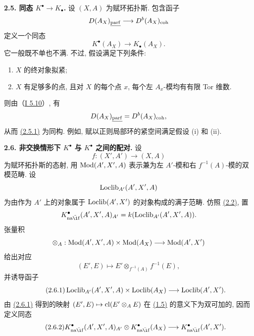 \textbf{2.5. 同态 \(K^{\bullet}\to K_{\bullet}\).} 设 \((X,A)\) 为赋环拓扑斯. 包含函子
\[
 D(A_X)_{\underline{\operatorname{parf}}}\longrightarrow D^b(A_X)_{\operatorname{coh}}
\]
定义一个同态
\begin{equation}\tag{2.5.1}
 K^{\bullet}(A_X)\longrightarrow K_{\bullet}(A_X).
\end{equation}
它一般既不单也不满. 不过, 假设满足下列条件:
\begin{enumerate}[label=(\roman*)]
\item \(X\) 的终对象拟紧;
\item \(X\) 有足够多的点, 且对 \(X\) 的每个点 \(x\), 每个左 \(A_x\)-模均有有限 Tor 维数.
\end{enumerate}
则由（\hyperlink{sga6.e01.cor.5-10}{I 5.10}）, 有
\[
 D(A_X)_{\underline{\operatorname{parf}}}=D^b(A_X)_{\operatorname{coh}},
\]
从而 \hyperlink{sga6.e04.eq.2-5-1}{(2.5.1)} 为同构. 例如, 赋以正则局部环的紧空间满足假设 (i) 和 (ii).

\textbf{2.6. 非交换情形下 \(K^{\bullet}\) 与 \(K^{\bullet}\) 之间的配对.} 设
\[
 f:(X',A')\longrightarrow (X,A)
\]
为赋环拓扑斯的态射, 用 \(\operatorname{Mod}(A',X',A)\) 表示兼为左 \(A'\)-模和右 \(f^{-1}(A)\)-模的双模范畴. 设
\[
 \operatorname{Loclib}_{A'}(A',X',A)
\]
为由作为 \(A'\) 上的对象属于 \(\operatorname{Loclib}(A',X')\) 的对象构成的满子范畴. 仿照 \hyperlink{sga6.e04.def.2-2}{(2.2)}, 置
\[
 K^{\bullet}_{\naif}(A',X',A)_{A'}=k(\Loclib_{A'}(A',X',A)).
\]
张量积
\[
 \otimes_A:\operatorname{Mod}(A',X',A)\times\operatorname{Mod}(A_X)\longrightarrow \operatorname{Mod}(A',X')
\]
给出对应
\[
 (E',E)\longmapsto E'\otimes_{f^{-1}(A)}f^{-1}(E),
\]
并诱导函子
\begin{equation}\tag{2.6.1}
 \operatorname{Loclib}_{A'}(A',X',A)\times\operatorname{Loclib}(A_X)\longrightarrow\operatorname{Loclib}(A',X').
\end{equation}
由 \hyperlink{sga6.e04.eq.2-6-1}{(2.6.1)} 得到的映射 \((E',E)\mapsto\operatorname{cl}(E'\otimes_A E)\) 在 \hyperlink{sga6.e04.para.1-5}{(1.5)} 的意义下为双可加的, 因而定义同态
\begin{equation}\tag{2.6.2}
 K^{\bullet}_{\naif}(A',X',A)_{A'}\otimes K^{\bullet}_{\naif}(A_X)\longrightarrow K^{\bullet}_{\naif}(A',X').
\end{equation}


